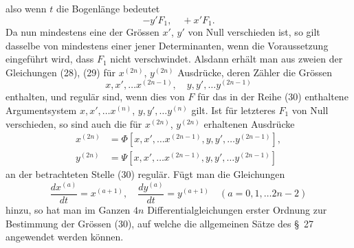 \documentclass[11pt,a4paper,leqno]{article}
\begin{document}
also wenn $t$ die Bogenlänge bedeutet
\[
-y'F_1,
\quad
+x'F_1.
\]
Da nun mindestens eine der Grössen $x'$, $y'$ von Null verschieden ist, so gilt dasselbe von mindestens einer jener Determinanten, wenn die Voraussetzung eingeführt wird, dass $F_1$ nicht verschwindet. Alsdann erhält man aus zweien der Gleichungen (28), (29) für $x^{(2n)}$, $y^{(2n)}$ Ausdrücke, deren Zähler die Grössen
\begin{equation}\tag{30}
x,x',\ldots x^{(2n-1)},\quad y,y',\ldots y^{(2n-1)}
\end{equation}
enthalten, und regulär sind, wenn dies von $F$ für das in der Reihe (30) enthaltene Argumentsystem $x,x',\ldots x^{(n)}$, $y,y',\ldots y^{(n)}$ gilt. Ist für letzteres $F_1$ von Null verschieden, so sind auch die für $x^{(2n)}$, $y^{(2n)}$ erhaltenen Ausdrücke
\begin{equation}\tag{31}
\begin{aligned}
x^{(2n)}&=\Phi[x,x',\ldots x^{(2n-1)},y,y',\ldots y^{(2n-1)}],\\
y^{(2n)}&=\Psi[x,x',\ldots x^{(2n-1)},y,y',\ldots y^{(2n-1)}]
\end{aligned}
\end{equation}
an der betrachteten Stelle (30) regulär. Fügt man die Gleichungen
\begin{equation}\tag{32}
\frac{dx^{(a)}}{dt}=x^{(a+1)},\quad
\frac{dy^{(a)}}{dt}=y^{(a+1)}\quad (a=0,1,\ldots 2n-2)
\end{equation}
hinzu, so hat man im Ganzen $4n$ Differentialgleichungen erster Ordnung zur Bestimmung der Grössen (30), auf welche die allgemeinen Sätze des \S~27 angewendet werden können.
\end{document}
